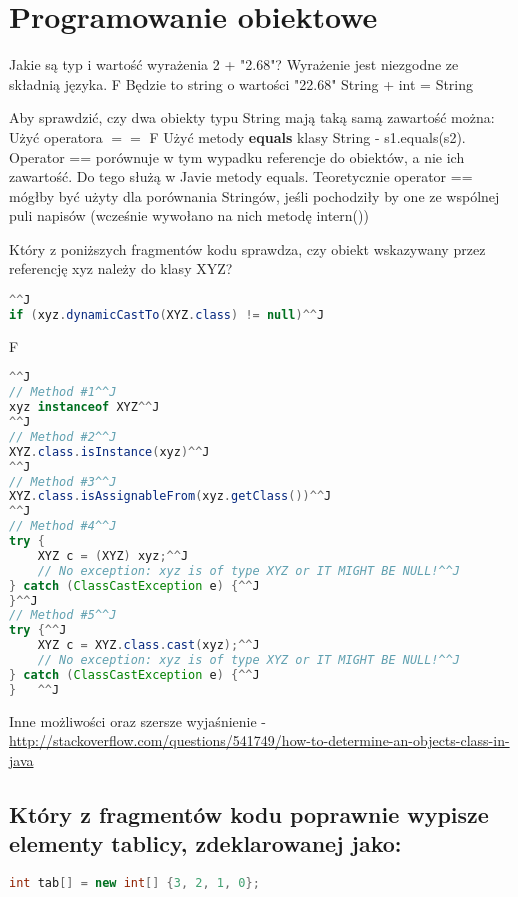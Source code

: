 \chapter{Programowanie obiektowe}
\PartialToc

\answer
{Jakie są typ i wartość wyrażenia 2 + "2.68"?}
{Wyrażenie jest niezgodne ze składnią języka.}
{F}
{Będzie  to string o wartości "22.68"}
{String + int = String}

\answer
{Aby sprawdzić, czy dwa obiekty typu String mają taką samą zawartość można:}
{Użyć operatora $==$}
{F}
{Użyć metody \textbf{equals} klasy String - s1.equals(s2).}
{Operator == porównuje w tym wypadku referencje do obiektów, a nie ich zawartość. Do tego służą w Javie metody equals. Teoretycznie operator == mógłby być użyty dla porównania Stringów, jeśli pochodziły by one ze wspólnej puli napisów (wcześnie wywołano na nich metodę intern())}

\answer
{Który z poniższych fragmentów kodu sprawdza, czy obiekt wskazywany przez referencję xyz należy do klasy XYZ?}
{
	\begin{lstlisting}[language=java]^^J
if (xyz.dynamicCastTo(XYZ.class) != null)^^J
	\end{lstlisting}
}
{F}
{
\begin{lstlisting}[language=java]^^J
// Method #1^^J
xyz instanceof XYZ^^J
^^J
// Method #2^^J
XYZ.class.isInstance(xyz)^^J
^^J
// Method #3^^J
XYZ.class.isAssignableFrom(xyz.getClass())^^J
^^J
// Method #4^^J
try {
    XYZ c = (XYZ) xyz;^^J
    // No exception: xyz is of type XYZ or IT MIGHT BE NULL!^^J
} catch (ClassCastException e) {^^J
}^^J
// Method #5^^J
try {^^J
    XYZ c = XYZ.class.cast(xyz);^^J
    // No exception: xyz is of type XYZ or IT MIGHT BE NULL!^^J
} catch (ClassCastException e) {^^J
}	^^J
\end{lstlisting}
}
{Inne możliwości oraz szersze wyjaśnienie - \url{http://stackoverflow.com/questions/541749/how-to-determine-an-objects-class-in-java} }


\section{Który z fragmentów kodu poprawnie wypisze elementy tablicy, zdeklarowanej jako:}
\begin{lstlisting}[language=java]
int tab[] = new int[] {3, 2, 1, 0};
\end{lstlisting}


